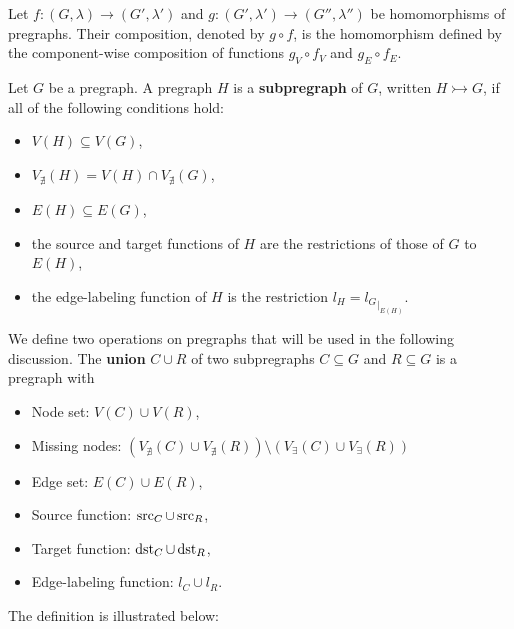 \begin{definition} 
    \label{def:pregraph:composition}
    Let $f: (G,\lambda) \mathop{\to} (G',\lambda')$ and $g: (G',\lambda') \mathop{\to} (G'',\lambda'')$ be homomorphisms of pregraphs. Their composition, denoted by $g \circ f$, is the homomorphism defined by the component-wise composition of functions $g_V \circ f_V$ and $g_E \circ f_E$.
\end{definition}
\begin{definition} 
    \label{def:subpregraph} Let $G$ be a pregraph. A pregraph $H$ is a \textbf{subpregraph} of $G$, written $H \mathop{\rightarrowtail} G$, if all of the following conditions hold:
     \begin{itemize} 
            \item $V(H) \mathop{\subseteq} V(G)$, \item $V_{\nexists}(H) \mathop{=} V(H) \mathop{\cap} V_{\nexists}(G)$, 
            \item $E(H) \mathop{\subseteq} E(G)$, 
            \item the source and target functions of $H$ are the restrictions of those of $G$ to $E(H)$,
            \item the edge-labeling function of $H$ is the restriction $l_H \mathop{=} {l_G}_{|_{E(H)}}$. 
        \end{itemize} 
\end{definition}
We define two operations on pregraphs that will be used in the following discussion.
The \textbf{union} $C \mathop{\cup} R$ of two subpregraphs $C \mathop{\subseteq} G$ and $R \mathop{\subseteq} G$ is a pregraph with 
\begin{itemize}
    \item Node set: $ V(C) \mathop{\cup} V(R) $,
    \item Missing nodes:
        $(
            V_{\nexists}(C) \mathop{\cup} V_{\nexists}(R)) \mathop{\setminus} 
            (   V_\exists(C) \mathop{\cup} 
             V_\exists(R)  
                   )$
    \item Edge set: $ E(C) \mathop{\cup} E(R) $, 
    \item Source function: $ \operatorname{src}_C \mathop{\cup} \operatorname{src}_R $,  
    \item Target function: $ \operatorname{dst}_C \mathop{\cup} \operatorname{dst}_R $,  
    \item Edge-labeling function: $ l_C \mathop{\cup} l_R $.   
\end{itemize} 
The definition is illustrated below:
